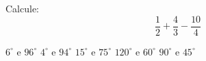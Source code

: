 Calcule:
\[\frac{1}{2}+\frac{4}{3}-\frac{10}{4}\]

$6^\circ$ e $96^\circ$
$4^\circ$ e $94^\circ$
$15^\circ$ e $75^\circ$
$120^\circ$ e $60^\circ$
$90^\circ$ e $45^\circ$





